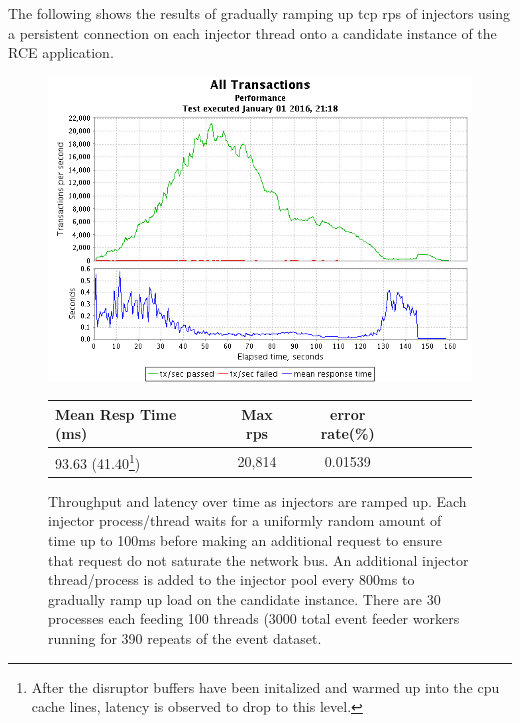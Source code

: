 \documentclass[a4paper,11pt]{scrreprt}
\begin{document}

The following shows the results of gradually ramping up \acrshort{tcp} \acrshort{rps} of injectors using a persistent connection on each injector thread onto a candidate instance of the RCE application.
\begin{figure}[h!]
\centering
\caption{Throughput and latency over time as injectors are ramped up. Each injector process/thread waits for a uniformly random amount of time up to 100ms before making an additional request to ensure that request do not saturate the network bus. An additional injector thread/process is added to the injector pool every 800ms to gradually ramp up load on the candidate instance. There are 30 processes each feeding 100 threads (3000 total event feeder workers running for 390 repeats of the event dataset.}
\includegraphics[scale=0.6, trim=0 -25 0 2, clip=true] {TCP_throughput.png}
\label{fig:udpthroughput}
\begin{tabular}{l*{6}{c}r}
Mean Resp Time (ms) & Max \acrshort{rps} & error rate(\%)\\
\hline
93.63 (41.40\footnote{After the disruptor buffers have been initalized and warmed up into the \acrshort{cpu} cache lines, latency is observed to drop to this level.}) & 20,814 & 0.01539
\end{tabular}
\end{figure}
\end{document}

